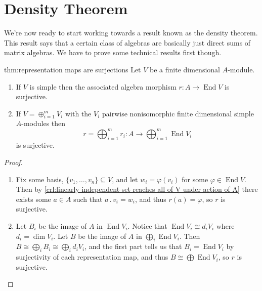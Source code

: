 \documentclass[fleqn]{NotesClass}
\DeclareMathOperator{\End}{End}
\newcommand{\action}{\mathbin{.}}
\newcommand{\isomorphic}{\cong}
\begin{document}
    \section{Density Theorem}
    We're now ready to start working towards a result known as the density theorem.
    This result says that a certain class of algebras are basically just direct sums of matrix algebras.
    We have to prove some technical results first though.
    
    \begin{thm}{}{thm:representation maps are surjections}
        Let \(V\) be a finite dimensional \(A\)-module.
        \begin{enumerate}
            \item If \(V\) is simple then the associated algebra morphism \(r \colon A \to \End V\) is surjective.
            \item If \(V = \oplus_{i=1}^m V_i\) with the \(V_i\) pairwise nonisomorphic finite dimensional simple \(A\)-modules then
            \begin{equation}
                r = \bigoplus_{i=1}^m r_i \colon A \to \bigoplus_{i=1}^m \End V_i
            \end{equation}
            is surjective.
        \end{enumerate}
        \begin{proof}
            \begin{enumerate}
                \item Fix some basis, \(\{v_1, \dotsc, v_n\} \subseteq V\), and let \(w_i = \varphi(v_i)\) for some \(\varphi \in \End V\).
                Then by \cref{crl:linearly independent set reaches all of V under action of A} there exists some \(a \in A\) such that \(a \action v_i = w_i\), and thus \(r(a) = \varphi\), so \(r\) is surjective.
                \item Let \(B_i\) be the image of \(A\) in \(\End V_i\).
                Notice that \(\End V_i \isomorphic d_i V_i\) where \(d_i = \dim V_i\).
                Let \(B\) be the image of \(A\) in \(\bigoplus_i \End V_i\).
                Then \(B \isomorphic \bigoplus_i B_i \isomorphic \bigoplus_i d_i V_i\), and the first part tells us that \(B_i = \End V_i\) by surjectivity of each representation map, and thus \(B \isomorphic \bigoplus \End V_i\), so \(r\) is surjective.
            \end{enumerate}
        \end{proof}
    \end{thm}
    
\end{document}
